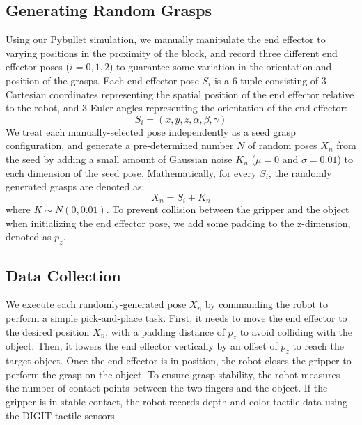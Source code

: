 \documentclass[11pt, a4paper]{report}
\theoremstyle{definition}
\begin{document}
\subsection{Generating Random Grasps}
\label{sec:4.1.1}
Using our Pybullet simulation, we manually manipulate the end effector to varying positions in the proximity of the block, and record three different end effector poses ($i=0,1,2$) to guarantee some variation in the orientation and position of the grasps. Each end effector pose $S_i$ is a 6-tuple consisting of 3 Cartesian coordinates representing the spatial position of the end effector relative to the robot, and 3 Euler angles representing the orientation of the end effector:
\begin{equation}
    S_i=(x,y,z,\alpha,\beta,\gamma)
\end{equation}
We treat each manually-selected pose independently as a seed grasp configuration, and generate a pre-determined number $N$ of random poses $X_n$ from the seed by adding a small amount of Gaussian noise $K_n$ ($\mu=0$ and $\sigma=0.01$) to each dimension of the seed pose. Mathematically, for every $S_i$, the randomly generated grasps are denoted as:
\begin{equation}
    X_n=S_i+K_n
\end{equation}
where $K\sim N(0,0.01)$. To prevent collision between the gripper and the object when initializing the end effector pose, we add some padding to the z-dimension, denoted as $p_z$.

\subsection{Data Collection}
\label{sec:4.1.2}
We execute each randomly-generated pose $X_n$ by commanding the robot to perform a simple pick-and-place task. First, it needs to move the end effector to the desired position $X_n$, with a padding distance of $p_z$ to avoid colliding with the object. Then, it lowers the end effector vertically by an offset of $p_z$ to reach the target object. Once the end effector is in position, the robot closes the gripper to perform the grasp on the object. To ensure grasp stability, the robot measures the number of contact points between the two fingers and the object. If the gripper is in stable contact, the robot records depth and color tactile data using the DIGIT tactile sensors.\\
\end{document}
